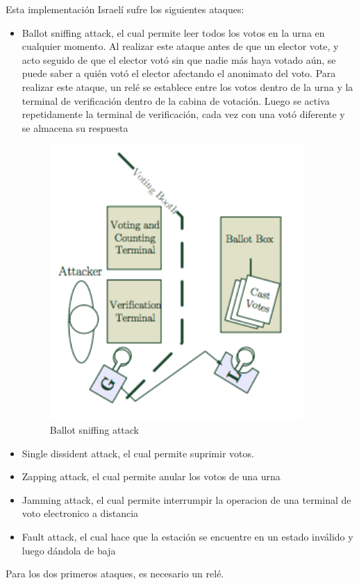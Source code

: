Esta implementación Israelí sufre los siguientes ataques:
\begin{itemize}
	\item Ballot sniffing attack, el cual permite leer todos los votos en la urna en cualquier momento. Al realizar este ataque antes de que un elector vote, y acto seguido de que el elector votó sin que nadie más haya votado aún,  se puede saber a quién votó el elector afectando el anonimato del voto. 
Para realizar este ataque, un relé se establece entre los votos dentro de la urna y la terminal de verificación dentro de la cabina de votación. Luego se activa repetidamente la terminal de verificación, cada vez con una votó diferente y se almacena su respuesta 
\begin{figure}[h!]
\includegraphics{Imagenes/privacidad3}
\caption{Ballot sniffing attack}
\end{figure}
	\item Single dissident attack, el cual permite suprimir votos. 

	\item Zapping attack, el cual permite anular los votos de una urna 

	\item Jamming attack, el cual permite interrumpir la operacion de una terminal de voto electronico a distancia

	\item Fault attack, el cual hace que la estación se encuentre en un estado inválido y luego dándola de baja 
	
\end{itemize}

Para los dos primeros ataques, es necesario un relé. 